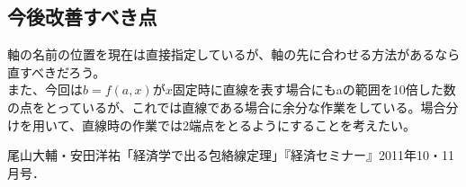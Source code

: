 \documentclass[11pt,a4j,fleqn]{jarticle}
\begin{document}
\subsection{今後改善すべき点}
軸の名前の位置を現在は直接指定しているが、軸の先に合わせる方法があるなら直すべきだろう。\\
また、今回は$b=f(a,x)$が$x$固定時に直線を表す場合にもaの範囲を10倍した数の点をとっているが、これでは直線である場合に余分な作業をしている。場合分けを用いて、直線時の作業では2端点をとるようにすることを考えたい。\\


\begin{thebibliography}{0}
尾山大輔・安田洋祐「経済学で出る包絡線定理」『経済セミナー』2011年10・11月号．
\end{thebibliography}
\end{document}
